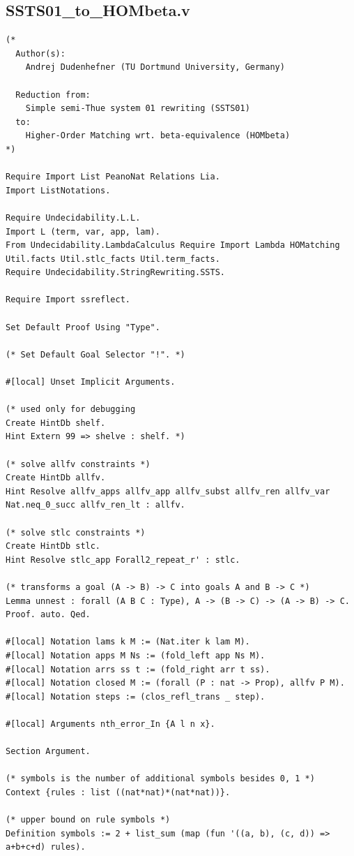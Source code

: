 \documentclass[10pt,a4paper]{amsart}
\begin{document}
\subsection*{SSTS01\_to\_HOMbeta.v}
\begin{lstlisting}
(*
  Author(s):
    Andrej Dudenhefner (TU Dortmund University, Germany)

  Reduction from:
    Simple semi-Thue system 01 rewriting (SSTS01)
  to:
    Higher-Order Matching wrt. beta-equivalence (HOMbeta)
*)

Require Import List PeanoNat Relations Lia.
Import ListNotations.

Require Undecidability.L.L.
Import L (term, var, app, lam).
From Undecidability.LambdaCalculus Require Import Lambda HOMatching Util.facts Util.stlc_facts Util.term_facts.
Require Undecidability.StringRewriting.SSTS.

Require Import ssreflect.

Set Default Proof Using "Type".

(* Set Default Goal Selector "!". *)

#[local] Unset Implicit Arguments.

(* used only for debugging 
Create HintDb shelf.
Hint Extern 99 => shelve : shelf. *)

(* solve allfv constraints *)
Create HintDb allfv.
Hint Resolve allfv_apps allfv_app allfv_subst allfv_ren allfv_var Nat.neq_0_succ allfv_ren_lt : allfv.

(* solve stlc constraints *)
Create HintDb stlc.
Hint Resolve stlc_app Forall2_repeat_r' : stlc.

(* transforms a goal (A -> B) -> C into goals A and B -> C *)
Lemma unnest : forall (A B C : Type), A -> (B -> C) -> (A -> B) -> C.
Proof. auto. Qed.

#[local] Notation lams k M := (Nat.iter k lam M).
#[local] Notation apps M Ns := (fold_left app Ns M).
#[local] Notation arrs ss t := (fold_right arr t ss).
#[local] Notation closed M := (forall (P : nat -> Prop), allfv P M).
#[local] Notation steps := (clos_refl_trans _ step).

#[local] Arguments nth_error_In {A l n x}.

Section Argument.

(* symbols is the number of additional symbols besides 0, 1 *)
Context {rules : list ((nat*nat)*(nat*nat))}.

(* upper bound on rule symbols *)
Definition symbols := 2 + list_sum (map (fun '((a, b), (c, d)) => a+b+c+d) rules).


\end{lstlisting}
\end{document}
